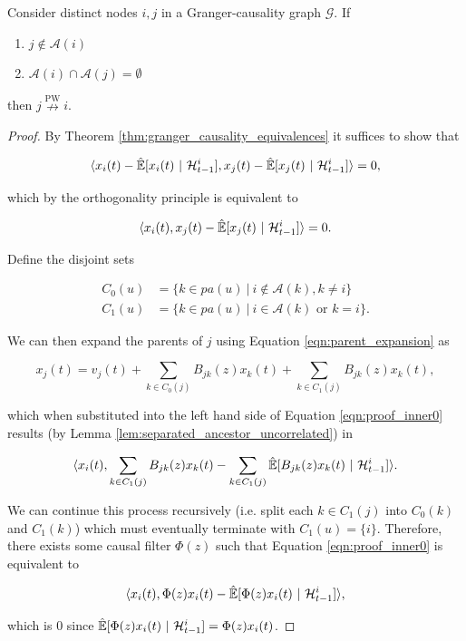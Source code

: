 \documentclass[12pt]{article}
\def\npwgc{\overset{\text{PW}}{\nrightarrow}}  %
\def\gcg{\mathcal{G}}  %
\def\H{\mathcal{H}}  %
\newcommand{\linE}[2]{\hat{\E}[#1\ |\ #2]}  %
\newcommand{\pa}[1]{pa(#1)}  %
\newcommand{\anc}[1]{\mathcal{A}(#1)}  %
\begin{document}
\begin{lemma}
  \label{lem:ancestor_uncorrelated}
  Consider distinct nodes $i, j$ in a Granger-causality graph $\gcg$.
  If

  \begin{enumerate}[label=(\alph*)]
    \item{$j \not\in \anc{i}$}
    \item{$\anc{i}\cap\anc{j} = \emptyset$}
  \end{enumerate}

  then $j \npwgc i$.
\end{lemma}
\begin{proof}
  By Theorem \ref{thm:granger_causality_equivalences} it suffices to show that

  \begin{equation*}
    \inner{x_i(t) - \linE{x_i(t)}{\H_{t - 1}^i}}{x_j(t) - \linE{x_j(t)}{\H_{t - 1}^i}} = 0,
  \end{equation*}

  which by the orthogonality principle is equivalent to

  \begin{equation}
    \label{eqn:proof_inner0}
    \inner{x_i(t)}{x_j(t) - \linE{x_j(t)}{\H_{t - 1}^i}} = 0.
  \end{equation}

  Define the disjoint sets

  \begin{align*}
    C_0(u) &= \{k \in \pa{u}\ |\ i \not\in \anc{k}, k \ne i \}\\
    C_1(u) &= \{k \in \pa{u}\ |\ i \in \anc{k} \text{ or } k = i \}.
  \end{align*}

  We can then expand the parents of $j$ using Equation \ref{eqn:parent_expansion} as

  \begin{equation*}
    x_j(t) = v_j(t) + \sum_{k \in C_0(j)} B_{jk}(z) x_k(t) + \sum_{k \in C_1(j)} B_{jk}(z) x_k(t),
  \end{equation*}

  which when substituted into the left hand side of Equation
  \ref{eqn:proof_inner0} results (by Lemma
  \ref{lem:separated_ancestor_uncorrelated}) in

  \begin{equation*}
    \inner{x_i(t)}{\sum_{k \in C_1(j)} B_{jk}(z) x_k(t) - \sum_{k \in C_1(j)} \linE{B_{jk}(z) x_k(t)}{\H_{t - 1}^i}}.
  \end{equation*}

  We can continue this process recursively (i.e. split each
  $k \in C_1(j)$ into $C_0(k)$ and $C_1(k)$) which must eventually
  terminate with $C_1(u) = \{i\}$.  Therefore, there exists some
  causal filter $\Phi(z)$ such that Equation \ref{eqn:proof_inner0} is
  equivalent to

  \begin{equation}
    \label{eqn:proof_inner0}
    \inner{x_i(t)}{\Phi(z)x_i(t) - \linE{\Phi(z)x_i(t)}{\H_{t - 1}^i}},
  \end{equation}

  which is $0$ since $\linE{\Phi(z)x_i(t)}{\H_{t - 1}^i} = \Phi(z)x_i(t)$.
\end{proof}
\end{document}
